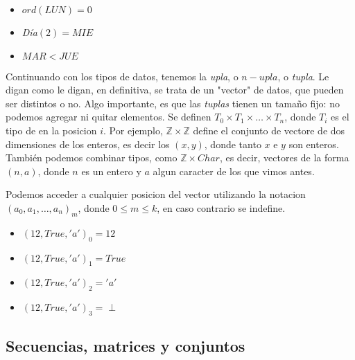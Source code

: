 \documentclass{article}
\begin{document}
\begin{multicols}{3}
\begin{center}
	\begin{itemize}
	
		\item[] $ord(LUN) = 0$
		\item[] \textit{Día}$(2) = MIE$
		\item[] $MAR < JUE$
	
	\end{itemize}
\end{center}
\end{multicols}

Continuando con los tipos de datos, tenemos la \textit{upla}, o $n-upla$, o \textit{tupla}. Le digan como le digan, en definitiva, se trata de un "vector" de datos, que pueden ser distintos o no. Algo importante, es que las \textit{tuplas} tienen un tamaño fijo: no podemos agregar ni quitar elementos. Se definen $T_{0} \times T_{1} \times \ldots \times T_{n}$, donde $T_{i}$ es el tipo de en la posicion $i$. Por ejemplo, $\mathbb{Z} \times \mathbb{Z}$ define el conjunto de vectore de dos dimensiones de los enteros, es decir los $(x, y)$, donde tanto $x$ e $y$ son enteros. También podemos combinar tipos, como $\mathbb{Z} \times Char$, es decir, vectores de la forma $(n, a)$, donde $n$ es un entero y $a$ algun caracter de los que vimos antes.

Podemos acceder a cualquier posicion del vector utilizando la notacion $(a_{0}, a_{1}, \ldots, a_{n})_{m}$, donde $0 \leq m \leq k$, en caso contrario se indefine.

\begin{multicols}{2}
\begin{center}
	\begin{itemize}
	
		\item[] $(12, True, 'a')_{0} = 12$
		\item[] $(12, True, 'a')_{1} = True$
		\item[] $(12, True, 'a')_{2} = 'a'$
		\item[] $(12, True, 'a')_{3} = \perp$
	
	\end{itemize}
\end{center}
\end{multicols}

\subsection{Secuencias, matrices y conjuntos}
\end{document}

